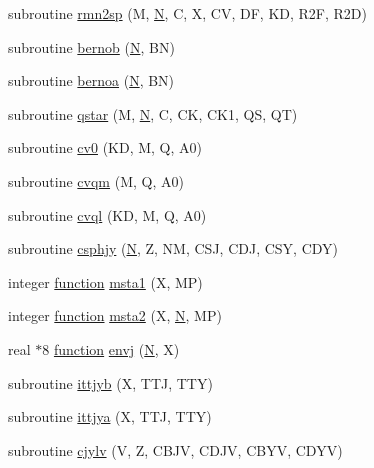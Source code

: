 \begin{DoxyCompactItemize}
\item 
subroutine \hyperlink{specfun_8f_accdd92c9d8eee39f3d1edc5c2bc5e2e2}{rmn2sp} (M, \hyperlink{polmisc_8c_a0240ac851181b84ac374872dc5434ee4}{N}, C, X, C\+V, D\+F, K\+D, R2\+F, R2\+D)
\item 
subroutine \hyperlink{specfun_8f_a917131b00e04b766e470293555be5c27}{bernob} (\hyperlink{polmisc_8c_a0240ac851181b84ac374872dc5434ee4}{N}, B\+N)
\item 
subroutine \hyperlink{specfun_8f_a3c34fbd8878081c45703ab82478f79cf}{bernoa} (\hyperlink{polmisc_8c_a0240ac851181b84ac374872dc5434ee4}{N}, B\+N)
\item 
subroutine \hyperlink{specfun_8f_a2daca8b0b7bd5dd1edf9c0a12da12992}{qstar} (M, \hyperlink{polmisc_8c_a0240ac851181b84ac374872dc5434ee4}{N}, C, C\+K, C\+K1, Q\+S, Q\+T)
\item 
subroutine \hyperlink{specfun_8f_a6aef902470a94d73f58168d0b2ff9df2}{cv0} (K\+D, M, Q, A0)
\item 
subroutine \hyperlink{specfun_8f_a37e994dd7fc04e361d7b7c47c47624dc}{cvqm} (M, Q, A0)
\item 
subroutine \hyperlink{specfun_8f_a1f4a5001cd0e90b38430b2bc2bebb055}{cvql} (K\+D, M, Q, A0)
\item 
subroutine \hyperlink{specfun_8f_a36edce8b7b584414cb1ee505a943db48}{csphjy} (\hyperlink{polmisc_8c_a0240ac851181b84ac374872dc5434ee4}{N}, Z, N\+M, C\+S\+J, C\+D\+J, C\+S\+Y, C\+D\+Y)
\item 
integer \hyperlink{afunc_8m_a7b5e596df91eadea6c537c0825e894a7}{function} \hyperlink{specfun_8f_a5871c795c7de08b92b66543b4bb6416c}{msta1} (X, M\+P)
\item 
integer \hyperlink{afunc_8m_a7b5e596df91eadea6c537c0825e894a7}{function} \hyperlink{specfun_8f_a43e97545ef3b5ad8478b2047977cc0a9}{msta2} (X, \hyperlink{polmisc_8c_a0240ac851181b84ac374872dc5434ee4}{N}, M\+P)
\item 
real $\ast$8 \hyperlink{afunc_8m_a7b5e596df91eadea6c537c0825e894a7}{function} \hyperlink{specfun_8f_a23d937dd9c77eef4f0238531c544d130}{envj} (\hyperlink{polmisc_8c_a0240ac851181b84ac374872dc5434ee4}{N}, X)
\item 
subroutine \hyperlink{specfun_8f_acb75e98e59feec356150ce3ad752ed38}{ittjyb} (X, T\+T\+J, T\+T\+Y)
\item 
subroutine \hyperlink{specfun_8f_adb9494c914036b40d71802a0c59db428}{ittjya} (X, T\+T\+J, T\+T\+Y)
\item 
subroutine \hyperlink{specfun_8f_aa078aec1c031d56724a28cd1f824e696}{cjylv} (V, Z, C\+B\+J\+V, C\+D\+J\+V, C\+B\+Y\+V, C\+D\+Y\+V)

\end{DoxyCompactItemize}
